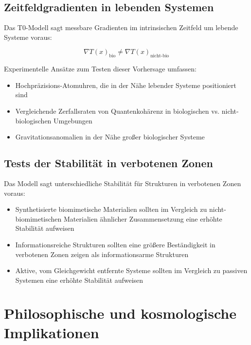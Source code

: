 \documentclass[12pt,a4paper]{article}
\newcommand{\Tfield}{T(x)}
\begin{document}
	\subsection{Zeitfeldgradienten in lebenden Systemen}
	\label{subsec:time_field_gradients}
	
	Das T0-Modell sagt messbare Gradienten im intrinsischen Zeitfeld um lebende Systeme voraus:
	
	\begin{equation}
		\nabla \Tfield_{\text{bio}} \neq \nabla \Tfield_{\text{nicht-bio}}
	\end{equation}
	
	Experimentelle Ansätze zum Testen dieser Vorhersage umfassen:
	
	\begin{itemize}
		\item Hochpräzisions-Atomuhren, die in der Nähe lebender Systeme positioniert sind
		\item Vergleichende Zerfallsraten von Quantenkohärenz in biologischen vs. nicht-biologischen Umgebungen
		\item Gravitationsanomalien in der Nähe großer biologischer Systeme
	\end{itemize}
	
	\subsection{Tests der Stabilität in verbotenen Zonen}
	\label{subsec:forbidden_zone_tests}
	
	Das Modell sagt unterschiedliche Stabilität für Strukturen in verbotenen Zonen voraus:
	
	\begin{itemize}
		\item Synthetisierte biomimetische Materialien sollten im Vergleich zu nicht-biomimetischen Materialien ähnlicher Zusammensetzung eine erhöhte Stabilität aufweisen
		\item Informationsreiche Strukturen sollten eine größere Beständigkeit in verbotenen Zonen zeigen als informationsarme Strukturen
		\item Aktive, vom Gleichgewicht entfernte Systeme sollten im Vergleich zu passiven Systemen eine erhöhte Stabilität aufweisen
	\end{itemize}
	
	\section{Philosophische und kosmologische Implikationen}
	\label{sec:philosophical_implications}
	
\end{document}
